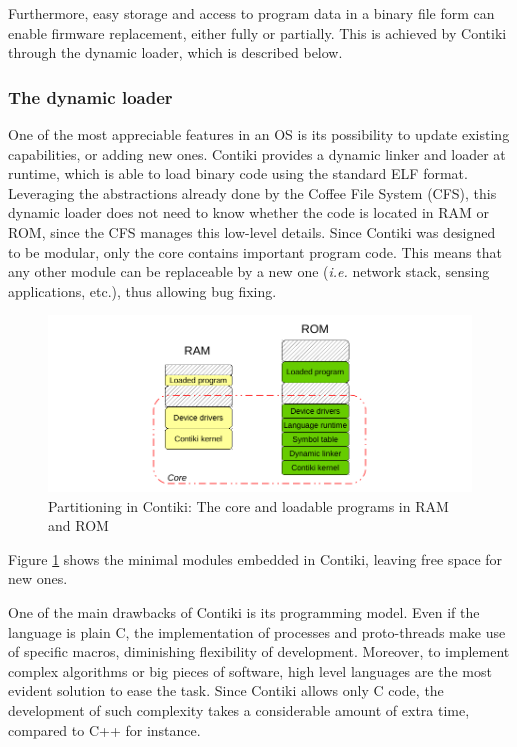 Furthermore, easy storage and access to program data in a binary file form can enable firmware replacement, either fully or partially.
This is achieved by Contiki through the dynamic loader, which is described below.

\subsubsection{The dynamic loader}
One of the most appreciable features in an OS is its possibility to update existing capabilities, or adding new ones.
Contiki provides a dynamic linker and loader at runtime, which is able to load binary code using the standard ELF format\cite{tis1995tool}.
Leveraging the abstractions already done by the Coffee File System (CFS), this dynamic loader does not need to know whether the code is located in RAM or ROM, since the CFS manages this low-level details.
Since Contiki was designed to be modular, only the core contains important program code.
This means that any other module can be replaceable by a new one (\textit{i.e.} network stack, sensing applications, etc.), thus allowing bug fixing.

\begin{figure}[htb]
	\centering
	\includegraphics[width=1\columnwidth]{chapters/background.images/ContikiPartitioning.pdf}
	\caption{Partitioning in Contiki: The core and loadable programs in RAM and ROM\cite{dunkels06runtime}}
	\label{fig:ContikiModules}
\end{figure}

Figure \ref{fig:ContikiModules} shows the minimal modules embedded in Contiki, leaving free space for new ones.

One of the main drawbacks of Contiki is its programming model.
Even if the language is plain C, the implementation of processes and proto-threads make use of specific macros, diminishing flexibility of development.
Moreover, to implement complex algorithms or big pieces of software, high level languages are the most evident solution to ease the task.
Since Contiki allows only C code, the development of such complexity takes a considerable amount of extra time, compared to C++ for instance.

